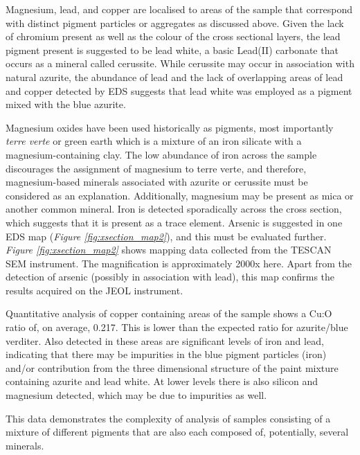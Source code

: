 Magnesium, lead, and copper are localised to areas of the sample that correspond with distinct pigment particles or aggregates as discussed above. Given the lack of chromium present as well as the colour of the cross sectional layers, the lead pigment present is suggested to be lead white, a basic Lead(II) carbonate that occurs as a mineral called cerussite. While cerussite may occur in association with natural azurite,\autocite{Aru} the abundance of lead and the lack of overlapping areas of lead and copper detected by EDS suggests that lead white was employed as a pigment mixed with the blue azurite.

Magnesium oxides have been used historically as pigments, most importantly \textit{terre verte} or green earth which is a mixture of an iron silicate with a magnesium-containing clay. The low abundance of iron across the sample discourages the assignment of magnesium to terre verte, and therefore, magnesium-based minerals associated with azurite or cerussite must be considered as an explanation. Additionally, magnesium may be present as mica or another common mineral. Iron is detected sporadically across the cross section, which suggests that it is present as a trace element. Arsenic is suggested in one EDS map (\textit{Figure \ref{fig:xsection_map2}}), and this must be evaluated further. \textit{Figure \ref{fig:xsection_map2}} shows mapping data collected from the TESCAN SEM instrument. The magnification is approximately 2000x here. Apart from the detection of arsenic (possibly in association with lead), this map confirms the results acquired on the JEOL instrument.


Quantitative analysis of copper containing areas of the sample shows a Cu:O ratio of, on average, 0.217. This is lower than the expected ratio for azurite/blue verditer. Also detected in these areas are significant levels of iron and lead, indicating that there may be impurities in the blue pigment particles (iron) and/or contribution from the three dimensional structure of the paint mixture containing azurite and lead white. At lower levels there is also silicon and magnesium detected, which may be due to impurities as well. 

This data demonstrates the complexity of analysis of samples consisting of a mixture of different pigments that are also each composed of, potentially, several minerals.



